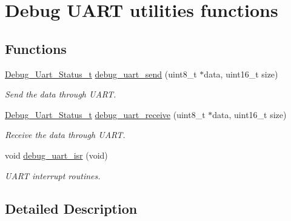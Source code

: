 \hypertarget{group___debug___uart___exported___functions___group2}{}\section{Debug U\+A\+RT utilities functions}
\label{group___debug___uart___exported___functions___group2}
\subsection*{Functions}
\begin{DoxyCompactItemize}
\item 
\hyperlink{group___debug___uart___exported___types_ga334c43797179106e55aa97a2d7fe2e78}{Debug\+\_\+\+Uart\+\_\+\+Status\+\_\+t} \hyperlink{group___debug___uart___exported___functions___group2_ga971b3b5273865312295e9f9c484236ae}{debug\+\_\+uart\+\_\+send} (uint8\+\_\+t $\ast$data, uint16\+\_\+t size)
\begin{DoxyCompactList}\small\item\em Send the data through U\+A\+RT. \end{DoxyCompactList}\item 
\hyperlink{group___debug___uart___exported___types_ga334c43797179106e55aa97a2d7fe2e78}{Debug\+\_\+\+Uart\+\_\+\+Status\+\_\+t} \hyperlink{group___debug___uart___exported___functions___group2_gae9dce37ed6c148c17bd2dc67c9f28fc9}{debug\+\_\+uart\+\_\+receive} (uint8\+\_\+t $\ast$data, uint16\+\_\+t size)
\begin{DoxyCompactList}\small\item\em Receive the data through U\+A\+RT. \end{DoxyCompactList}\item 
void \hyperlink{group___debug___uart___exported___functions___group2_ga7a880511e4fc8f2c3cad647324136dd3}{debug\+\_\+uart\+\_\+isr} (void)\hypertarget{group___debug___uart___exported___functions___group2_ga7a880511e4fc8f2c3cad647324136dd3}{}\label{group___debug___uart___exported___functions___group2_ga7a880511e4fc8f2c3cad647324136dd3}

\begin{DoxyCompactList}\small\item\em U\+A\+RT interrupt routines. \end{DoxyCompactList}\end{DoxyCompactItemize}


\subsection{Detailed Description}


